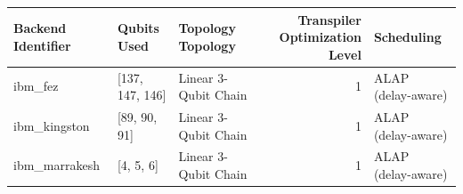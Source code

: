 \begin{tabular}{lllrl}
\toprule
Backend Identifier & Qubits Used & Topology Topology & Transpiler Optimization Level & Scheduling \\
\midrule
ibm_fez & [137, 147, 146] & Linear 3-Qubit Chain & 1 & ALAP (delay-aware) \\
ibm_kingston & [89, 90, 91] & Linear 3-Qubit Chain & 1 & ALAP (delay-aware) \\
ibm_marrakesh & [4, 5, 6] & Linear 3-Qubit Chain & 1 & ALAP (delay-aware) \\
\bottomrule
\end{tabular}
